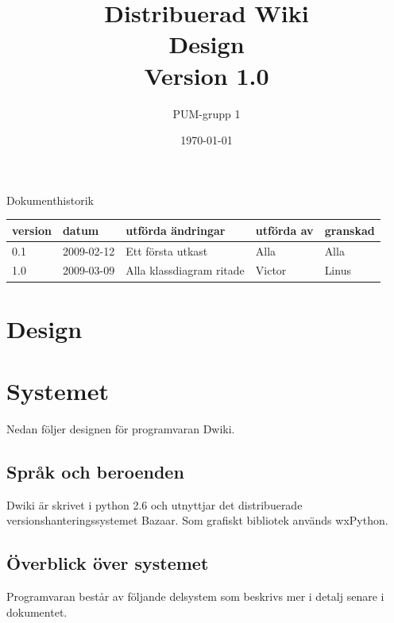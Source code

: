 

\ifpdf
\else
\fi

\title{Distribuerad Wiki \\ Design \\ Version 1.0}
\author{PUM-grupp 1}
\date{\today}



\maketitle

\thispagestyle{empty}

\newpage

{\centering \Large{Dokumenthistorik\\}}

\vspace{10pt}
\begin{tabularx}{\textwidth}{ |l|l|X|l|l| }
  \hline
    \textbf{version} & \textbf{datum} & \textbf{utförda ändringar} & \textbf{utförda av} & \textbf{granskad} \\
	\hline 
  0.1 & 2009-02-12 &  Ett första utkast  & Alla & Alla   \\
	\hline	
  1.0 & 2009-03-09 & Alla klassdiagram ritade & Victor & Linus\\

  \hline
\end{tabularx}

\newpage

\setcounter{tocdepth}{3}
\tableofcontents
\newpage

\section{Design}

\section{Systemet}
Nedan följer designen för programvaran Dwiki.
\subsection{Språk och beroenden}
Dwiki är skrivet i python 2.6 och utnyttjar det distribuerade versionshanteringssystemet Bazaar. Som grafiskt bibliotek används wxPython.
\subsection{Överblick över systemet}
Programvaran består av följande delsystem som beskrivs mer i detalj senare i dokumentet.
